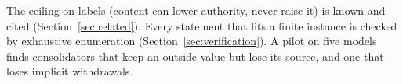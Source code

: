 The ceiling on labels (content can lower authority, never raise it) is known and cited
(Section~\ref{sec:related}). Every statement that fits a finite instance is checked by exhaustive
enumeration (Section~\ref{sec:verification}). A pilot on five models finds consolidators that keep an
outside value but lose its source, and one that loses implicit withdrawals.
